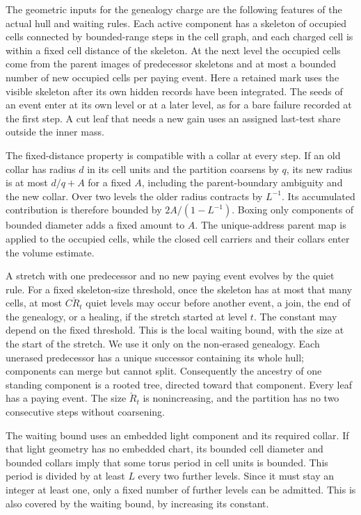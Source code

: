 \documentclass[11pt,letterpaper,reqno]{amsart}
\numberwithin{equation}{section}
\theoremstyle{definition}
\theoremstyle{remark}
\begin{document}
The geometric inputs for the genealogy charge are the following
features of the actual hull and waiting rules. Each active
component has a skeleton of occupied cells connected by
bounded-range steps in the cell graph, and each charged cell
is within a fixed cell distance of the skeleton. At the next
level the occupied cells come from the parent images of
predecessor skeletons and at most a bounded number of new
occupied cells per paying event. Here a retained mark uses
the visible skeleton after its own hidden records have been
integrated. The seeds of an event enter at its own level or
at a later level, as for a bare failure recorded at the first
step. A cut leaf that needs a new gain uses an assigned
last-test share outside the inner mass.

The fixed-distance property is compatible with a collar
at every step. If an old collar has radius \(d\) in its
cell units and the partition coarsens by \(q\), its
new radius is at most \(d/q+A\) for a fixed \(A\),
including the parent-boundary ambiguity and the new collar.
Over two levels the older radius contracts by \(L^{-1}\).
Its accumulated contribution is therefore bounded by
\(2A/(1-L^{-1})\). Boxing only components of bounded diameter
adds a fixed amount to \(A\). The unique-address parent
map is applied to the occupied cells, while the closed
cell carriers and their collars enter the volume estimate.

A stretch with one predecessor and no new
paying event evolves by the quiet rule. For a fixed
skeleton-size threshold, once the skeleton has at most
that many cells, at most \(C\check R_t\) quiet levels may
occur before another event, a join, the end of the genealogy,
or a healing,
if the stretch started at level \(t\).
The constant may depend on the fixed threshold. This is
the local waiting bound, with the size at the start of the
stretch. We use it only on the non-erased
genealogy. Each unerased predecessor has a unique successor
containing its whole hull; components can merge but cannot split.
Consequently the ancestry of one standing component is a rooted
tree, directed toward that component. Every leaf has a paying
event. The size
\(\check R_t\) is nonincreasing, and the partition has no
two consecutive steps without coarsening.

The waiting bound uses an embedded light component and its
required collar. If that light geometry has no embedded
chart, its bounded cell diameter and bounded collars imply
that some torus period in cell units is bounded. This
period is divided by at least \(L\) every two further
levels. Since it must stay an integer at least one, only
a fixed number of further levels can be admitted. This is
also covered by the waiting bound, by increasing its
constant.
\end{document}
